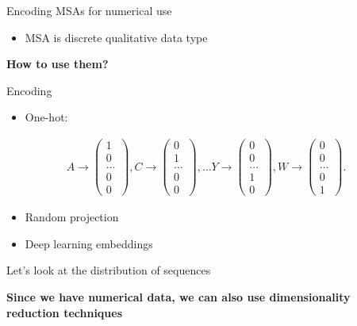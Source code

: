 \documentclass[presentation,smaller]{beamer}
\begin{document}
\begin{frame}[label={sec:org8912148}]{Encoding MSAs for numerical use}
\begin{itemize}
\item MSA is discrete qualitative data type
\end{itemize}

\begin{center}
\textbf{How to use them?}
\end{center}

\begin{block}{Encoding}
\begin{itemize}
\item One-hot:
\end{itemize}
\begin{equation*}
\begin{split}
A \rightarrow \begin{pmatrix} 1\\ 0\\ \dots \\ 0\\ 0 \end{pmatrix},
C \rightarrow \begin{pmatrix} 0\\ 1\\ \dots \\ 0\\ 0 \end{pmatrix},
\dots
Y \rightarrow \begin{pmatrix} 0\\ 0\\ \dots \\ 1\\ 0 \end{pmatrix},
W \rightarrow \begin{pmatrix} 0\\ 0\\ \dots \\ 0\\ 1 \end{pmatrix}.
\end{split}
\end{equation*}
\begin{itemize}
\item Random projection
\item Deep learning embeddings
\end{itemize}
\end{block}
\end{frame}

\begin{frame}[label={sec:orgce1e4b4}]{Let's look at the distribution of sequences}
\begin{center}
\Large \textbf{Since we have numerical data, we can also use dimensionality reduction techniques}
\end{center}
\end{frame}
\end{document}
